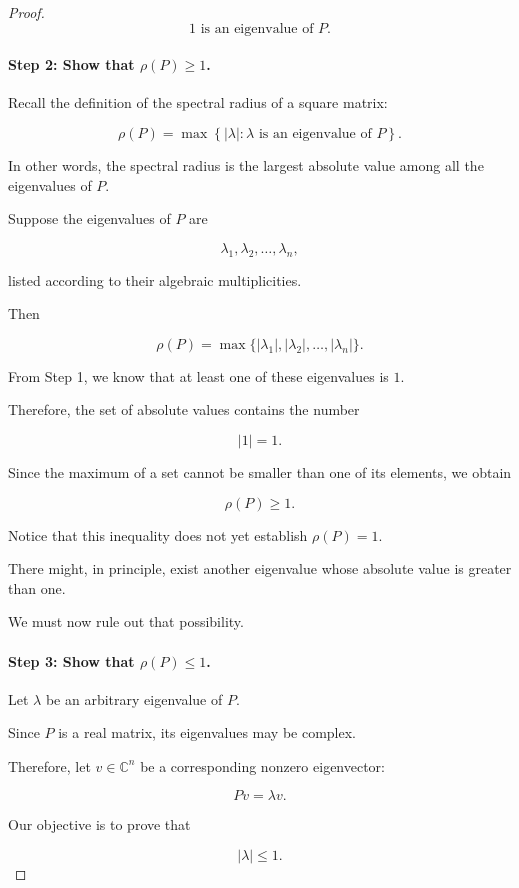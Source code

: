 \documentclass[11pt,a4paper]{article}
\theoremstyle{definition}
\theoremstyle{remark}
\begin{document}
\begin{proof}
\[
\boxed{1\text{ is an eigenvalue of }P.}
\]


\paragraph{Step 2: Show that $\rho(P)\geq1$.}

Recall the definition of the
spectral radius of a square matrix:

\[
\rho(P)
=
\max\left\{
|\lambda|:
\lambda\text{ is an eigenvalue of }P
\right\}.
\]

In other words, the spectral radius
is the largest absolute value among
all the eigenvalues of $P$.

Suppose the eigenvalues of $P$ are

\[
\lambda_1,\lambda_2,\ldots,\lambda_n,
\]

listed according to their
algebraic multiplicities.

Then

\[
\rho(P)
=
\max\{
|\lambda_1|,
|\lambda_2|,
\ldots,
|\lambda_n|
\}.
\]

From Step 1, we know that at least
one of these eigenvalues is $1$.

Therefore, the set of absolute values
contains the number

\[
|1|=1.
\]

Since the maximum of a set
cannot be smaller than one
of its elements, we obtain

\[
\boxed{\rho(P)\geq1.}
\]

Notice that this inequality
does not yet establish
$\rho(P)=1$.

There might, in principle,
exist another eigenvalue
whose absolute value is
greater than one.

We must now rule out
that possibility.


\paragraph{Step 3: Show that $\rho(P)\leq1$.}

Let $\lambda$ be an arbitrary
eigenvalue of $P$.

Since $P$ is a real matrix,
its eigenvalues may be complex.

Therefore, let
$v\in\mathbb{C}^n$ be
a corresponding nonzero
eigenvector:

\[
Pv=\lambda v.
\]

Our objective is to prove that

\[
|\lambda|\leq1.
\]


\end{proof}
\end{document}
